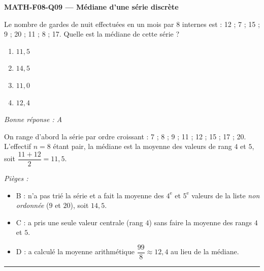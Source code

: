 \documentclass[11pt,a4paper]{article}
\begin{document}
\noindent\textbf{MATH-F08-Q09 --- Médiane d'une série discrète}\par
Le nombre de gardes de nuit effectuées en un mois par 8 internes est : 12 ; 7 ; 15 ; 9 ; 20 ; 11 ; 8 ; 17. Quelle est la médiane de cette série ?
\begin{enumerate}[label=\Alph*)]
\item $11{,}5$
\item $14{,}5$
\item $11{,}0$
\item $12{,}4$
\end{enumerate}
\textit{Bonne réponse : A}\par
On range d'abord la série par ordre croissant : 7 ; 8 ; 9 ; 11 ; 12 ; 15 ; 17 ; 20. L'effectif $n=8$ étant pair, la médiane est la moyenne des valeurs de rang $4$ et $5$, soit $\dfrac{11+12}{2}=11{,}5$.\par
\textit{Pièges :}
\begin{itemize}
\item B : n'a pas trié la série et a fait la moyenne des $4^{\text{e}}$ et $5^{\text{e}}$ valeurs de la liste \emph{non ordonnée} ($9$ et $20$), soit $14{,}5$.
\item C : a pris une seule valeur centrale (rang $4$) sans faire la moyenne des rangs $4$ et $5$.
\item D : a calculé la moyenne arithmétique $\dfrac{99}{8}\approx12{,}4$ au lieu de la médiane.
\end{itemize}
\vspace{8pt}\hrule\vspace{8pt}
\end{document}
